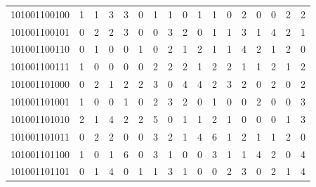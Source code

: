 \documentclass[10pt,a4paper]{article}
\begin{document}
\begin{longtable}{ |c|c|c|c|c|c|c|c|c|c|c|c|c|c|c|c|c| }
    101001100100              & 1                            & 1                                & 3                            & 3                              & 0   & 1   & 1   & 0   & 1   & 1   & 0   & 2   & 0   & 0   & 2   & 2   \\
    101001100101              & 0                            & 2                                & 2                            & 3                              & 0   & 0   & 3   & 2   & 0   & 1   & 1   & 3   & 1   & 4   & 2   & 1   \\
    101001100110              & 0                            & 1                                & 0                            & 0                              & 1   & 0   & 2   & 1   & 2   & 1   & 1   & 4   & 2   & 1   & 2   & 0   \\
    101001100111              & 1                            & 0                                & 0                            & 0                              & 0   & 2   & 2   & 2   & 1   & 2   & 2   & 1   & 1   & 2   & 1   & 2   \\
    101001101000              & 0                            & 2                                & 1                            & 2                              & 2   & 3   & 0   & 4   & 4   & 2   & 3   & 2   & 0   & 2   & 0   & 2   \\
    101001101001              & 1                            & 0                                & 0                            & 1                              & 0   & 2   & 3   & 2   & 0   & 1   & 0   & 0   & 2   & 0   & 0   & 3   \\
    101001101010              & 2                            & 1                                & 4                            & 2                              & 2   & 5   & 0   & 1   & 1   & 2   & 1   & 0   & 0   & 0   & 1   & 3   \\
    101001101011              & 0                            & 2                                & 2                            & 0                              & 0   & 3   & 2   & 1   & 4   & 6   & 1   & 2   & 1   & 1   & 2   & 0   \\
    101001101100              & 1                            & 0                                & 1                            & 6                              & 0   & 3   & 1   & 0   & 0   & 3   & 1   & 1   & 4   & 2   & 0   & 4   \\
    101001101101              & 0                            & 1                                & 4                            & 0                              & 1   & 1   & 3   & 1   & 0   & 0   & 2   & 3   & 0   & 2   & 1   & 4   \\

\end{longtable}
\end{document}
